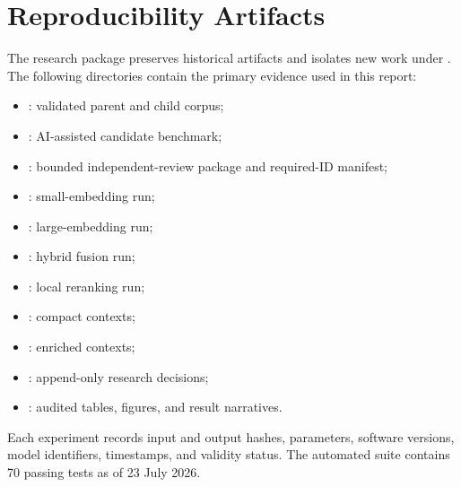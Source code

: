 \chapter{Reproducibility Artifacts}
\label{app:reproducibility}

The research package preserves historical artifacts and isolates new work under . The following directories contain the primary evidence used in this report:

\begin{itemize}
  \item {}: validated parent and child corpus;
  \item {}: AI-assisted candidate benchmark;
  \item {}: bounded independent-review package and required-ID manifest;
  \item {}: small-embedding run;
  \item {}: large-embedding run;
  \item {}: hybrid fusion run;
  \item {}: local reranking run;
  \item {}: compact contexts;
  \item {}: enriched contexts;
  \item {}: append-only research decisions;
  \item {}: audited tables, figures, and result narratives.
\end{itemize}

Each experiment records input and output hashes, parameters, software versions, model identifiers, timestamps, and validity status. The automated suite contains 70 passing tests as of 23 July 2026.



